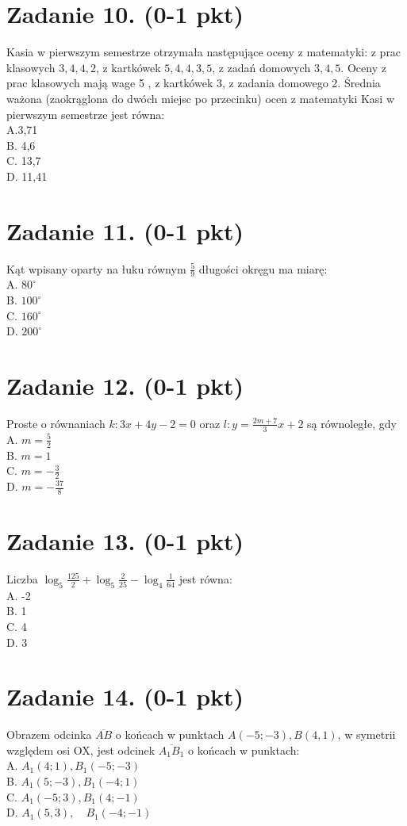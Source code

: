 \documentclass[10pt]{article}
\begin{document}
\section*{Zadanie 10. (0-1 pkt)}
Kasia w pierwszym semestrze otrzymała następujące oceny z matematyki: z prac klasowych \(3,4,4,2\), z kartkówek \(5,4,4,3,5\), z zadań domowych \(3,4,5\). Oceny z prac klasowych mają wage 5 , z kartkówek 3, z zadania domowego 2. Średnia ważona (zaokrąglona do dwóch miejsc po przecinku) ocen z matematyki Kasi w pierwszym semestrze jest równa:\\
A.3,71\\
B. 4,6\\
C. 13,7\\
D. 11,41

\section*{Zadanie 11. (0-1 pkt)}
Kąt wpisany oparty na łuku równym \(\frac{5}{9}\) długości okręgu ma miarę:\\
A. \(80^{\circ}\)\\
B. \(100^{\circ}\)\\
C. \(160^{\circ}\)\\
D. \(200^{\circ}\)

\section*{Zadanie 12. (0-1 pkt)}
Proste o równaniach \(k: 3 x+4 y-2=0\) oraz \(l: y=\frac{2 m+7}{3} x+2\) są równoległe, gdy\\
A. \(m=\frac{5}{2}\)\\
B. \(m=1\)\\
C. \(m=-\frac{3}{2}\)\\
D. \(m=-\frac{37}{8}\)

\section*{Zadanie 13. (0-1 pkt)}
Liczba \(\log _{5} \frac{125}{2}+\log _{5} \frac{2}{25}-\log _{4} \frac{1}{64}\) jest równa:\\
A. -2\\
B. 1\\
C. 4\\
D. 3

\section*{Zadanie 14. (0-1 pkt)}
Obrazem odcinka \(\overline{A B}\) o końcach w punktach \(A(-5 ;-3), B(4,1)\), w symetrii względem osi OX, jest odcinek \(\overline{A_{1} B_{1}}\) o końcach w punktach:\\
A. \(A_{1}(4 ; 1), B_{1}(-5 ;-3)\)\\
B. \(A_{1}(5 ;-3), B_{1}(-4 ; 1)\)\\
C. \(A_{1}(-5 ; 3), B_{1}(4 ;-1)\)\\
D. \(A_{1}(5,3), \quad B_{1}(-4 ;-1)\)
\end{document}
